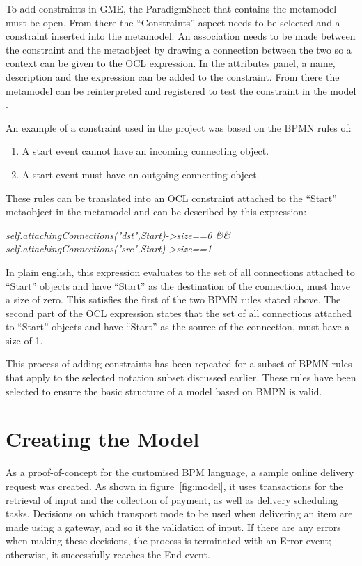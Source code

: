 \documentclass[11pt, a4paper, oneside, openright]{article}
\begin{document}
To add constraints in GME, the ParadigmSheet that contains the metamodel must be
open. From there the “Constraints” aspect needs to be selected and a constraint
inserted into the metamodel. An association needs to be made between the
constraint and the metaobject by drawing a connection between the two so a
context can be given to the OCL expression. In the attributes panel, a name,
description and the expression can be added to the constraint. From there the
metamodel can be reinterpreted and registered to test the constraint in the
model \cite{gmeSite}.

An example of a constraint used in the project was based on the BPMN rules of:
\begin{enumerate}
  \item A start event cannot have an incoming connecting object.
  \item A start event must have an outgoing connecting object.
\end{enumerate}

These rules can be translated into an OCL constraint attached to the “Start”
metaobject in the metamodel and can be described by this expression:

\begin{center}
	\textit{self.attachingConnections("dst",Start)-\textgreater size==0 \&\& \\
            self.attachingConnections("src",Start)-\textgreater size==1}
\end{center}

In plain english, this expression evaluates to the set of all connections
attached to “Start” objects and have “Start” as the destination of the
connection, must have a size of zero. This satisfies the first of the two BPMN
rules stated above. The second part of the OCL expression states that the set of
all connections attached to “Start” objects and have “Start” as the source of
the connection, must have a size of 1.

This process of adding constraints has been repeated for a subset of BPMN rules
that apply to the selected notation subset discussed earlier. These rules have
been selected to ensure the basic structure of a model based on BMPN is valid.

\section{Creating the Model}

As a proof-of-concept for the customised BPM language, a sample online delivery
request was created. As shown in figure~\ref{fig:model}, it uses transactions for the
retrieval of input and the collection of payment, as well as delivery scheduling
tasks. Decisions on which transport mode to be used when delivering an item are
made using a gateway, and so it the validation of input. If there are any errors
when making these decisions, the process is terminated with an Error event;
otherwise, it successfully reaches the End event.
\end{document}
